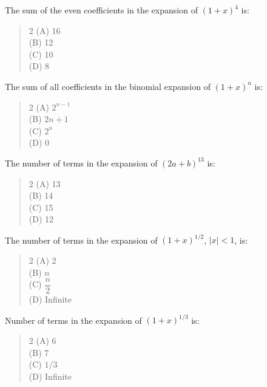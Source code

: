 \documentclass[11pt,a4paper]{article}
\begin{document}
\begin{mcqlist}
\item The sum of the even coefficients in the expansion of $(1+x)^4$ is:
\begin{quote}\begin{multicols}{2}
\noindent (A) 16 \\
(B) 12 \\
(C) 10 \\
(D) 8
\end{multicols}\end{quote}

\item The sum of all coefficients in the binomial expansion of $(1+x)^n$ is:
\begin{quote}\begin{multicols}{2}
\noindent (A) $2^{n-1}$ \\
(B) $2n+1$ \\
(C) $2^n$ \\
(D) 0
\end{multicols}\end{quote}

\item The number of terms in the expansion of $(2a+b)^{13}$ is:
\begin{quote}\begin{multicols}{2}
\noindent (A) 13 \\
(B) 14 \\
(C) 15 \\
(D) 12
\end{multicols}\end{quote}

\item The number of terms in the expansion of $(1+x)^{1/2}$, $|x|<1$, is:
\begin{quote}\begin{multicols}{2}
\noindent (A) 2 \\
(B) $n$ \\
(C) $\dfrac{n}{2}$ \\
(D) Infinite
\end{multicols}\end{quote}

\item Number of terms in the expansion of $(1+x)^{1/3}$ is:
\begin{quote}\begin{multicols}{2}
\noindent (A) 6 \\
(B) 7 \\
(C) $1/3$ \\
(D) Infinite
\end{multicols}\end{quote}


\end{mcqlist}
\end{document}
